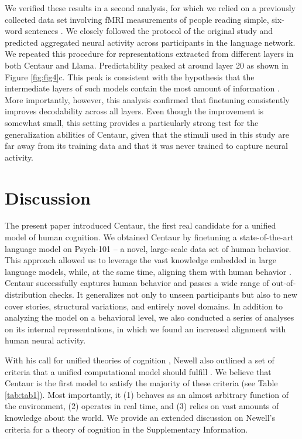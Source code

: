 \documentclass[pdflatex,sn-nature]{sn-jnl}%
\theoremstyle{thmstyleone}%
\theoremstyle{thmstyletwo}%
\theoremstyle{thmstylethree}%
\begin{document}
We verified these results in a second analysis, for which we relied on a previously collected data set involving fMRI measurements of people reading simple, six-word sentences \cite{tuckute2024driving}. We closely followed the protocol of the original study and predicted aggregated neural activity across participants in the language network. We repeated this procedure for representations extracted from different layers in both Centaur and Llama. Predictability peaked at around layer 20 as shown in Figure \ref{fig:fig4}c. This peak is consistent with the hypothesis that the intermediate layers of such models contain the most amount of information \cite{lad2024remarkable}.  More importantly, however, this analysis confirmed that finetuning consistently improves decodability across all layers. Even though the improvement is somewhat small, this setting provides a particularly strong test for the generalization abilities of Centaur, given that the stimuli used in this study are far away from its training data and that it was never trained to capture neural activity.

\section*{Discussion}\label{sec12}

The present paper introduced Centaur, the first real candidate for a unified model of human cognition. We obtained Centaur by finetuning a state-of-the-art language model on Psych-101 -- a novel, large-scale data set of human behavior. This approach allowed us to leverage the vast knowledge embedded in large language models, while, at the same time, aligning them with human behavior \cite{binz2024turning}. Centaur successfully captures human behavior and passes a wide range of out-of-distribution checks. It generalizes not only to unseen participants but also to new cover stories, structural variations, and entirely novel domains. In addition to analyzing the model on a behavioral level, we also conducted a series of analyses on its internal representations, in which we found an increased alignment with human neural activity.

With his call for unified theories of cognition \cite{Newell1990-NEWUTO}, Newell also outlined a set of criteria that a unified computational model should fulfill \cite{anderson2003newell}. We believe that Centaur is the first model to satisfy the majority of these criteria (see Table \ref{tab:tab1}). Most importantly, it (1) behaves as an almost arbitrary function of the environment, (2) operates in real time, and (3) relies on vast amounts of knowledge about the world. We provide an extended discussion on Newell's criteria for a theory of cognition in the Supplementary Information. 
\end{document}
